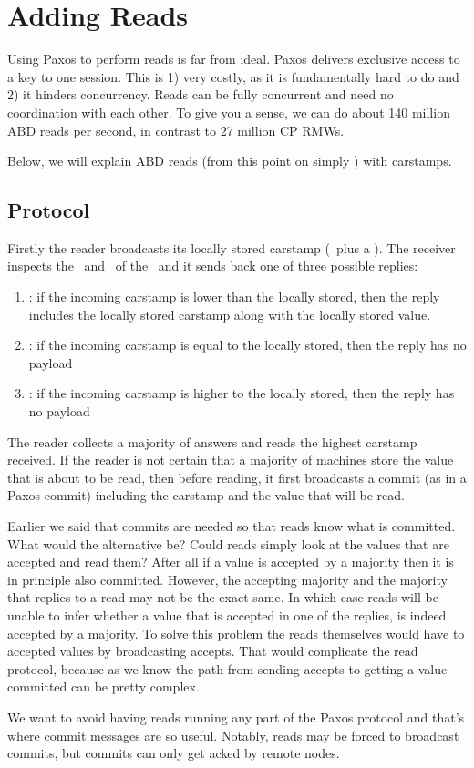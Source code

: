 \section{Adding Reads}\label{sec:reads}

Using Paxos to perform reads is far from ideal. Paxos delivers exclusive access to a key to one session. This is 1) very costly, as it is fundamentally hard to do and 2) it hinders concurrency. Reads can be fully concurrent and need no coordination with each other. To give you a sense, 
we can do about 140 million ABD reads per second, in contrast to 27 million CP RMWs. 

Below, we will explain ABD reads (from this point on simply ) with carstamps. 


\subsection{Protocol}
Firstly the reader broadcasts its locally stored carstamp (\logno~plus a \basets).
The receiver inspects the \basets~and \comlogno~of the \kv~and it sends back one of three possible replies:
\begin{enumerate}
    \item \carstamplow: if the incoming carstamp is lower than the locally stored, then the reply includes the locally stored carstamp along with the locally stored value.
    \item \carstampequal: if the incoming carstamp is equal to the locally stored, then the reply has no payload
    \item \carstamphigh: if the incoming carstamp is higher to the locally stored, then the reply has no payload
\end{enumerate}

The reader collects a majority of answers and reads the highest carstamp received.
If the reader is not certain that a majority of machines store the value that is about to be read, then before reading, it  first broadcasts a commit (as in a Paxos commit) including the carstamp and the value that will be read.

\custvspace
{}
Earlier we said that commits are needed so that reads know what is committed.
What would the alternative be? Could reads simply look at the values that are accepted and read them? After all if a value is accepted by a majority then it is in principle also committed. However, the accepting majority and the majority that replies to a read may not be the exact same. In which case reads will be unable to infer whether a value that is accepted in one of the replies, is indeed accepted by a majority. To solve this problem the reads themselves would have to  accepted values by broadcasting accepts. That would complicate the read protocol, because as we know the path from sending accepts to getting a value committed can be pretty complex.

We want to avoid having reads running any part of the Paxos protocol and that's where commit messages are so useful. Notably, reads may be forced to broadcast commits, but commits can only get acked by remote nodes.


